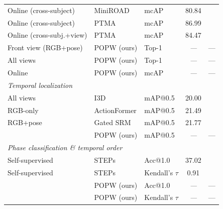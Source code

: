 \documentclass[11pt,a4paper]{article}
\newcommand{\popw}{POPW}
\newcommand{\map}{mAP}
\newcommand{\todo}{\textit{---}}              %
\newcommand{\popwres}{\todo}                  %
\begin{document}
\begin{table}[!htbp]
\begin{tabular}{l l l c c}
Online (cross-subject)  & MiniROAD             & mcAP    & 80.84 & \cite{xie2025ptma} \\
Online (cross-subject)  & PTMA                 & mcAP    & 86.99 & \cite{xie2025ptma} \\
Online (cross-subj.+view) & PTMA               & mcAP    & 84.47 & \cite{xie2025ptma} \\
Front view (RGB+pose)   & \popw{} (ours)       & Top-1   & \popwres & --- \\
All views               & \popw{} (ours)       & Top-1   & \popwres & --- \\
Online                  & \popw{} (ours)       & mcAP    & \popwres & --- \\
\midrule
\multicolumn{5}{l}{\textit{Temporal localization}} \\
All views & I3D                       & \map{}@0.5 & 20.00 & \cite{benshabat2021ikea} \\
RGB-only  & ActionFormer              & \map{}@0.5 & 21.49 & \cite{gatedsrm2026} \\
RGB+pose  & Gated SRM                 & \map{}@0.5 & 21.77 & \cite{gatedsrm2026} \\
          & \popw{} (ours)            & \map{}@0.5 & \popwres & --- \\
\midrule
\multicolumn{5}{l}{\textit{Phase classification \& temporal order}} \\
Self-supervised & STEPs               & Acc@1.0          & 37.02 & \cite{shah2023steps} \\
Self-supervised & STEPs               & Kendall's $\tau$ &  0.91 & \cite{shah2023steps} \\
                & \popw{} (ours)      & Acc@1.0          & \popwres & --- \\
                & \popw{} (ours)      & Kendall's $\tau$ & \popwres & --- \\
\bottomrule
\end{tabular}
\end{table}
\end{document}
